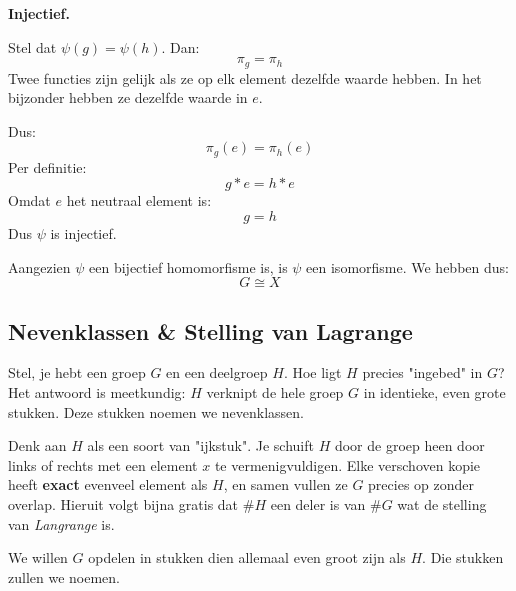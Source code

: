 \begin{nicetheorem}
    \vspace{0.15cm}

    \textbf{Injectief.}

    Stel dat $\psi(g) = \psi(h)$. Dan:
    \begin{equation*}
        \pi_g = \pi_h
    \end{equation*}
    Twee functies zijn gelijk als ze op elk element dezelfde waarde hebben. In het bijzonder hebben ze dezelfde waarde in $e$.

    Dus:
    \begin{equation*}
        \pi_g(e) = \pi_h(e)
    \end{equation*}
    Per definitie:
    \begin{equation*}
        g*e = h*e
    \end{equation*}
    Omdat $e$ het neutraal element is:
    \begin{equation*}
        g=h
    \end{equation*}
    Dus $\psi$ is injectief.

    \vspace{0.15cm}

    Aangezien $\psi$ een bijectief homomorfisme is, is $\psi$ een isomorfisme.
    We hebben dus:
    \begin{equation*}
        G \cong X
    \end{equation*}
\end{nicetheorem}

\subsection{Nevenklassen \& Stelling van Lagrange}


Stel, je hebt een groep $G$ en een deelgroep $H$. Hoe ligt $H$ precies "ingebed" in $G$? Het antwoord is meetkundig: $H$ verknipt de hele groep $G$ in identieke, even grote stukken. Deze stukken noemen we nevenklassen.

Denk aan $H$ als een soort van "ijkstuk". Je schuift $H$ door de groep heen door links of rechts met een element $x$ te vermenigvuldigen. Elke verschoven kopie heeft \textbf{exact} evenveel element als $H$, en samen vullen ze $G$ precies op zonder overlap. Hieruit volgt bijna gratis dat $\#H$ een deler is van $\#G$ wat de stelling van \emph{Langrange} is.


We willen $G$ opdelen in stukken dien allemaal even groot zijn als $H$. Die stukken zullen we  noemen.

